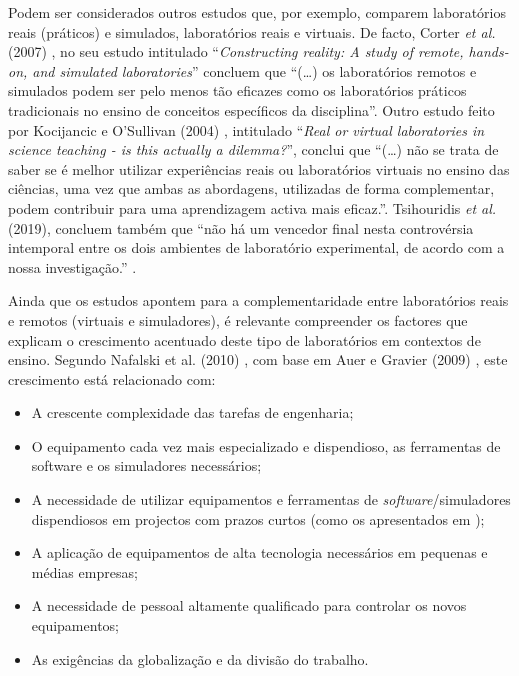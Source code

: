 Podem ser considerados outros estudos que, por exemplo, comparem laboratórios reais (práticos) e simulados, laboratórios reais e virtuais. De facto, Corter \textit{et al.} (2007) \cite{StudyRemoteHandsonSimulatedLabs}, no seu estudo intitulado ``\textit{Constructing reality: A study of remote, hands-on, and simulated laboratories}'' concluem que ``(\ldots) os laboratórios remotos e simulados podem ser pelo menos tão eficazes como os laboratórios práticos tradicionais no ensino de conceitos específicos da disciplina''. Outro estudo feito por Kocijancic e O'Sullivan (2004) \cite{RealorVirtualDilema}, intitulado ``\textit{Real or virtual laboratories in science teaching - is this actually a dilemma?}'', conclui que ``(\ldots) não se trata de saber se é melhor utilizar experiências reais ou laboratórios virtuais no ensino das ciências, uma vez que ambas as abordagens, utilizadas de forma complementar, podem contribuir para uma aprendizagem activa mais eficaz.''. Tsihouridis \textit{et al.} (2019), concluem também que ``não há um vencedor final nesta controvérsia intemporal entre os dois ambientes de laboratório experimental, de acordo com a nossa investigação.'' \cite{controversy}.

Ainda que os estudos apontem para a complementaridade entre laboratórios reais e remotos (virtuais e simuladores), é relevante compreender os factores que explicam o crescimento acentuado deste tipo de laboratórios em contextos de ensino. Segundo Nafalski et al. (2010) \cite{ExperiencesRemoteLaboratories}, com base em Auer e Gravier (2009) \cite{ThemMnyfacesRemotLab}, este crescimento está relacionado com:

\begin{itemize}
    \item A crescente complexidade das tarefas de engenharia;
    \item O equipamento cada vez mais especializado e dispendioso, as ferramentas de software e os simuladores necessários;
    \item A necessidade de utilizar equipamentos e ferramentas de \textit{software}/simuladores dispendiosos em projectos com prazos curtos (como os apresentados em \cite{ExperiencesRemoteLab});
    \item A aplicação de equipamentos de alta tecnologia necessários em pequenas e médias empresas;
    \item A necessidade de pessoal altamente qualificado para controlar os novos equipamentos;
    \item As exigências da globalização e da divisão do trabalho.
\end{itemize}

